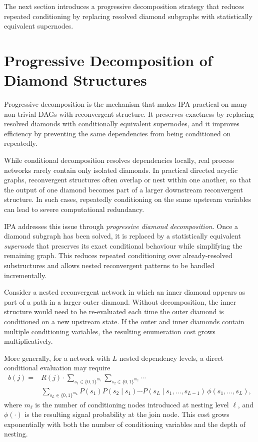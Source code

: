 \documentclass[preprint,12pt]{elsarticle}
\begin{document}
The next section introduces a progressive decomposition strategy that reduces repeated conditioning by replacing resolved diamond subgraphs with statistically equivalent supernodes.


\section{Progressive Decomposition of Diamond Structures}
Progressive decomposition is the mechanism that makes IPA practical on many non-trivial DAGs with reconvergent structure. It preserves exactness by replacing resolved diamonds with conditionally equivalent supernodes, and it improves efficiency by preventing the same dependencies from being conditioned on repeatedly.

While conditional decomposition resolves dependencies locally, real process networks rarely contain only isolated diamonds. In practical directed acyclic graphs, reconvergent structures often overlap or nest within one another, so that the output of one diamond becomes part of a larger downstream reconvergent structure. In such cases, repeatedly conditioning on the same upstream variables can lead to severe computational redundancy.

IPA addresses this issue through \emph{progressive diamond decomposition}. Once a diamond subgraph has been solved, it is replaced by a statistically equivalent \emph{supernode} that preserves its exact conditional behaviour while simplifying the remaining graph. This reduces repeated conditioning over already-resolved substructures and allows nested reconvergent patterns to be handled incrementally.

Consider a nested reconvergent network in which an inner diamond appears as part of a path in a larger outer diamond. Without decomposition, the inner structure would need to be re-evaluated each time the outer diamond is conditioned on a new upstream state. If the outer and inner diamonds contain multiple conditioning variables, the resulting enumeration cost grows multiplicatively.

More generally, for a network with $L$ nested dependency levels, a direct conditional evaluation may require
\begin{align}
b(j) = & R(j) \cdot
\sum_{s_1 \in \{0,1\}^{m_1}}
\sum_{s_2 \in \{0,1\}^{m_2}}
\cdots \nonumber \\ 
&
\sum_{s_L \in \{0,1\}^{m_L}}
P(s_1)P(s_2\mid s_1)\cdots P(s_L\mid s_1,\ldots,s_{L-1})
\,\phi(s_1,\ldots,s_L),
\label{eq:nested_direct_enum}
\end{align}
where $m_\ell$ is the number of conditioning nodes introduced at nesting level $\ell$, and $\phi(\cdot)$ is the resulting signal probability at the join node. This cost grows exponentially with both the number of conditioning variables and the depth of nesting.
\end{document}
